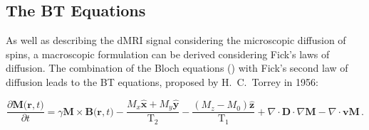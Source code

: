 \subsection{The \acl{BT} Equations}
\label{sec:bg_bloch_torrey}
As well as describing the \ac{dMRI} signal considering the microscopic diffusion of spins, a macroscopic formulation can be derived considering Fick's laws of diffusion. The combination of the Bloch equations () with Fick's second law of diffusion leads to the \ac{BT} equations, proposed by H.\ C.\ Torrey in 1956\cite{Torrey1956,Callaghan1991,Price2009}:

\begin{equation}
  \frac{\partial\mathbf{M(r},t)}{\partial t} = \gamma \mathbf{M \times B(r}, t) - \frac{M_x\mathbf{\hat{x}} + M_y\mathbf{\hat{y}}}{\mathrm{T}_2} - \frac{(M_z - M_0)\mathbf{\hat{z}}}{\mathrm{T}_1} + \nabla \cdot \mathbf{D} \cdot \nabla \mathbf{M} - \nabla \cdot \mathbf{vM}\,.
  \label{eq:bloch_torrey}
\end{equation}

